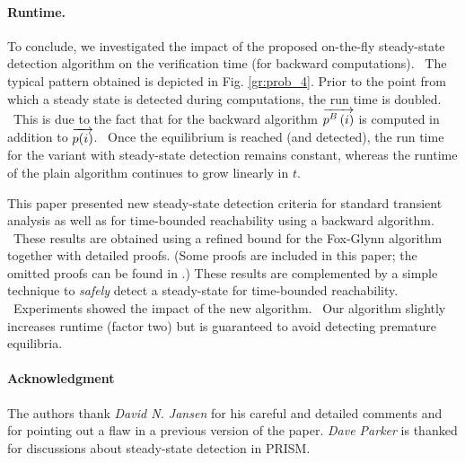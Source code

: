 \documentclass[times, 10pt,twocolumn]{article}
\begin{document}
	\paragraph{Runtime.}
		To conclude, we investigated the impact of the proposed on-the-fly steady-state detection algorithm on the verification time (for backward computations).  The typical pattern obtained is depicted in Fig. \ref{gr:prob_4}. Prior to the point from which a steady state is detected during computations, the run time is doubled.  This is due to the fact that for the backward algorithm $\overrightarrow{p^{B}\left( i \right)}$ is computed in addition to $\overrightarrow{p(i)}$.  Once the equilibrium is reached (and detected), the run time for the variant with steady-state detection remains constant, whereas the runtime of the plain algorithm continues to grow linearly in $t$.

	This paper presented new steady-state detection criteria for standard transient analysis as well as for time-bounded reachability using a backward algorithm.  These results are obtained using a refined bound for the Fox-Glynn algorithm together with detailed proofs. (Some proofs are included in this paper; the omitted proofs can be found in \cite{KatoenZ_TR05}.) These results are complemented by a simple technique to \emph{safely} detect a steady-state for time-bounded reachability.  Experiments showed the impact of the new algorithm.  Our algorithm slightly increases runtime (factor two) but is guaranteed to avoid detecting premature equilibria.
	
	\paragraph{Acknowledgment}
	The authors thank \emph{David N. Jansen} for his careful and detailed comments and for pointing out a flaw in a previous version of the paper. \emph{Dave Parker} is thanked for discussions about steady-state detection in PRISM.

{\footnotesize
	
}
\end{document}
